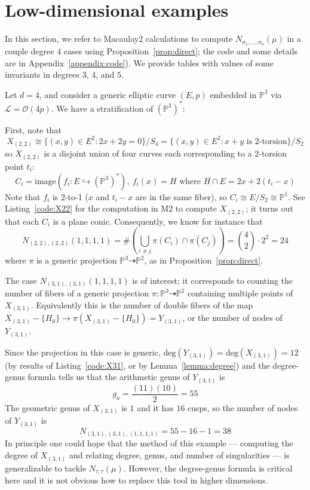 \documentclass[thesis]{thesis-umich}           %
\renewcommand{\P}{\mathbb P}
\theoremstyle{definition}
\begin{document}
\section{Low-dimensional examples}

In this section, we refer to Macaulay2 calculations to
compute $N_{\sigma_1,\dots,\sigma_n}(\mu)$ in a couple degree $4$ cases
using Proposition~\ref{prop:direct}; the
code and some details are in Appendix~\ref{appendix:code}). We provide tables with values of some invariants in degrees $3$, $4$, and $5$.

Let $d=4$, and consider a generic elliptic curve $(E,p)$ embedded in $\P^3$ via
$\mathcal L=\mathcal O(4p)$. We have a stratification of $(\P^3)^*$:


First, note that \[X_{(2,2)}\cong\{(x,y)\in E^2:2x+2y=0\}/S_4=\{(x,y)\in E^2:x+y\text{ is 2-torsion}\}/S_2\]
so $X_{(2,2)}$ is a disjoint union of four curves each corresponding to a 2-torsion point $t_i$:
\[
C_i=\text{image}(f_i:E\hookrightarrow(\P^3)^*),\ f_i(x)=H\text{ where }H\cap E=2x+2(t_i-x)
\]
Note that $f_i$ is 2-to-1 ($x$ and $t_i-x$ are in the same fiber), so $C_i\cong E/S_2\cong\P^1$. See Listing~\ref{code:X22} for the computation in M2 to compute $X_{(2,2)}$; it turns out that each $C_i$ is a plane conic. Consequently,
we know for instance that
\[
N_{(2,2),(2,2)}(1,1,1,1)=\#\left(\bigcup_{i\neq j}\pi(C_i)\cap \pi(C_j)\right)=\binom 42\cdot 2^2=24
\]
where $\pi$ is a generic projection $\P^3\dashrightarrow\P^2$, as in
Proposition~\ref{prop:direct}.

The case $N_{(3,1),(3,1)}(1,1,1,1)$ is of interest; it corresponds to counting
the number of fibers of a generic projection $\pi:\P^3\dashrightarrow\P^2$
containing multiple points of $X_{(3,1)}$. Equivalently this is the number of
double fibers of the map $X_{(3,1)}-\{H_0\}\to \pi(X_{(3,1)}-\{H_0\})=Y_{(3,1)}$, or the number of nodes of $Y_{(3,1)}$.

Since the projection in this case is generic, $\text{deg}(Y_{(3,1)})=\text{deg}(X_{(3,1)})=12$ (by results of Listing~\ref{code:X31}, or by Lemma~\ref{lemma:degree}) and the degree-genus formula tells us that the arithmetic genus
of $Y_{(3,1)}$ is
\[
g_a=\frac{(11)(10)}{2}=55
\]
The geometric genus of $X_{(3,1)}$ is $1$ and it has $16$ cusps,
so the number of nodes of $Y_{(3,1)}$ is%
\[
N_{(3,1),(3,1),(1,1,1,1)}=55-16-1=38
\]
In principle one could hope that the method of this example ---
computing the degree of $X_{(3,1)}$ and relating degree, genus, and
number of singularities
--- is generalizable to tackle $N_{\tau,\tau}(\mu)$. However, the degree-genus
formula is critical here and it is not obvious how to replace this tool in higher dimensions.
\end{document}
